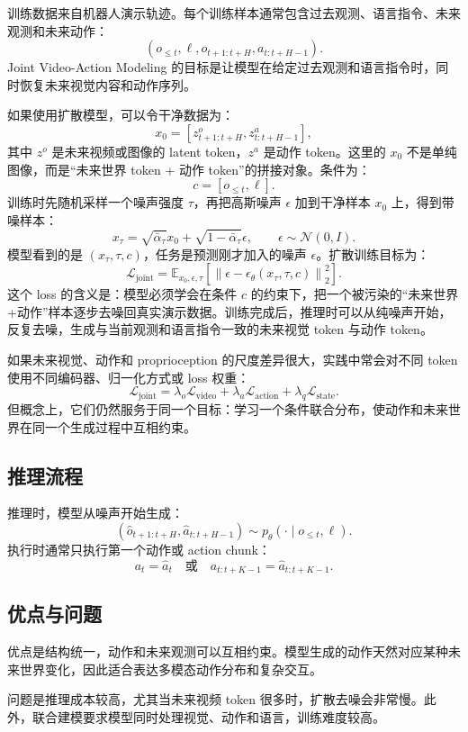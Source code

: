 \documentclass[11pt,a4paper]{ctexart}
\begin{document}
训练数据来自机器人演示轨迹。每个训练样本通常包含过去观测、语言指令、未来观测和未来动作：
\[
  (o_{\le t},\ell,o_{t+1:t+H},a_{t:t+H-1}).
\]
Joint Video-Action Modeling 的目标是让模型在给定过去观测和语言指令时，同时恢复未来视觉内容和动作序列。

如果使用扩散模型，可以令干净数据为：
\[
  x_0=[z^o_{t+1:t+H},z^a_{t:t+H-1}],
\]
其中 $z^o$ 是未来视频或图像的 latent token，$z^a$ 是动作 token。这里的 $x_0$ 不是单纯图像，而是“未来世界 token + 动作 token”的拼接对象。条件为：
\[
  c=[o_{\le t},\ell].
\]
训练时先随机采样一个噪声强度 $\tau$，再把高斯噪声 $\epsilon$ 加到干净样本 $x_0$ 上，得到带噪样本：
\[
  x_\tau=\sqrt{\bar{\alpha}_\tau}x_0+
  \sqrt{1-\bar{\alpha}_\tau}\epsilon,
  \qquad
  \epsilon\sim\mathcal{N}(0,I).
\]
模型看到的是 $(x_\tau,\tau,c)$，任务是预测刚才加入的噪声 $\epsilon$。扩散训练目标为：
\[
  \mathcal{L}_{\mathrm{joint}}
  =
  \mathbb{E}_{x_0,\epsilon,\tau}
  \left[
    \left\|
      \epsilon-\epsilon_\theta(x_\tau,\tau,c)
    \right\|_2^2
  \right].
\]
这个 loss 的含义是：模型必须学会在条件 $c$ 的约束下，把一个被污染的“未来世界+动作”样本逐步去噪回真实演示数据。训练完成后，推理时可以从纯噪声开始，反复去噪，生成与当前观测和语言指令一致的未来视觉 token 与动作 token。

如果未来视觉、动作和 proprioception 的尺度差异很大，实践中常会对不同 token 使用不同编码器、归一化方式或 loss 权重：
\[
  \mathcal{L}_{\mathrm{joint}}
  =
  \lambda_o\mathcal{L}_{\mathrm{video}}
  +
  \lambda_a\mathcal{L}_{\mathrm{action}}
  +
  \lambda_q\mathcal{L}_{\mathrm{state}}.
\]
但概念上，它们仍然服务于同一个目标：学习一个条件联合分布，使动作和未来世界在同一个生成过程中互相约束。

\subsection{推理流程}

推理时，模型从噪声开始生成：
\[
  (\hat{o}_{t+1:t+H},\hat{a}_{t:t+H-1})
  \sim
  p_\theta(\cdot\mid o_{\le t},\ell).
\]
执行时通常只执行第一个动作或 action chunk：
\[
  a_t=\hat{a}_t
  \quad \text{或} \quad
  a_{t:t+K-1}=\hat{a}_{t:t+K-1}.
\]

\subsection{优点与问题}

优点是结构统一，动作和未来观测可以互相约束。模型生成的动作天然对应某种未来世界变化，因此适合表达多模态动作分布和复杂交互。

问题是推理成本较高，尤其当未来视频 token 很多时，扩散去噪会非常慢。此外，联合建模要求模型同时处理视觉、动作和语言，训练难度较高。
\end{document}

